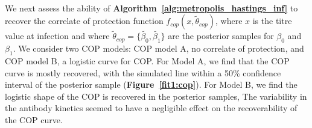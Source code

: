 \documentclass{article}
\begin{document}
\paragraph{}We next assess the ability of \textbf{Algorithm~\ref{alg:metropolis_hastings_inf}} to recover the correlate of protection function $f_{cop}(x, \tilde{\theta}_{cop})$, where $x$ is the titre value at infection and where $\tilde{\theta}_{cop} = \{\tilde{\beta_0}, \tilde{\beta_1}\}$ are the posterior samples for $\beta_0$ and $\beta_1$. We consider two COP models: COP model A, no correlate of protection, and COP model B, a logistic curve for COP. For Model A, we find that the COP curve is mostly recovered, with the simulated line within a 50\% confidence interval of the posterior sample (\textbf{Figure~\ref{fit1:cop}}). For Model B, we find the logistic shape of the COP is recovered in the posterior samples, The variability in the antibody kinetics seemed to have a negligible effect on the recoverability of the COP curve. 
\end{document}
